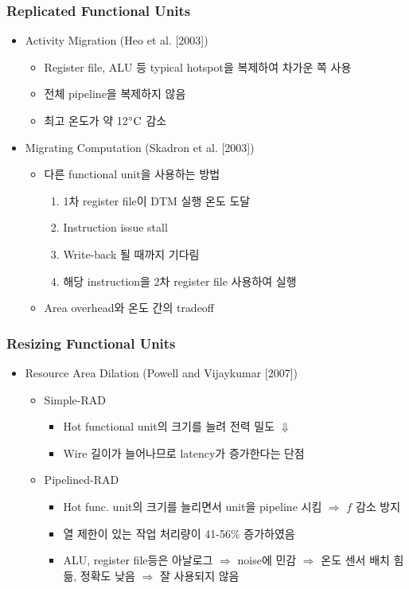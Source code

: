 \subsubsection*{Replicated Functional Units}
\begin{itemize}
    \item Activity Migration (Heo et al. [2003])
    \begin{itemize}
        \item Register file, ALU 등 typical hotspot을 복제하여 차가운 쪽 사용
        \item 전체 pipeline을 복제하지 않음
        \item 최고 온도가 약 12$^{\circ}\mathrm{C}$ 감소
    \end{itemize}
    \newpage
    \item Migrating Computation (Skadron et al. [2003])
    \begin{itemize}
        \item 다른 functional unit을 사용하는 방법
        \begin{enumerate}
            \item 1차 register file이 DTM 실행 온도 도달
            \item Instruction issue stall
            \item Write-back 될 때까지 기다림
            \item 해당 instruction을 2차 register file 사용하여 실행
        \end{enumerate}
        \item Area overhead와 온도 간의 tradeoff
    \end{itemize}
\end{itemize}

\subsubsection*{Resizing Functional Units}
\begin{itemize}
    \item Resource Area Dilation (Powell and Vijaykumar [2007])
    \begin{itemize}
        \item Simple-RAD
        \begin{itemize}
            \item Hot functional unit의 크기를 늘려 전력 밀도 $\Downarrow$
            \item Wire 길이가 늘어나므로 latency가 증가한다는 단점
        \end{itemize}
        \item Pipelined-RAD
        \begin{itemize}
            \item Hot func. unit의 크기를 늘리면서 unit을 pipeline 시킴 $\Rightarrow$ $f$ 감소 방지
            \item 열 제한이 있는 작업 처리량이 41-56\% 증가하였음
            \item ALU, register file등은 아날로그 $\Rightarrow$ noise에 민감
                $\Rightarrow$ 온도 센서 배치 힘듦, 정확도 낮음 $\Rightarrow$ 잘 사용되지 않음
        \end{itemize}
    \end{itemize}
\end{itemize}

